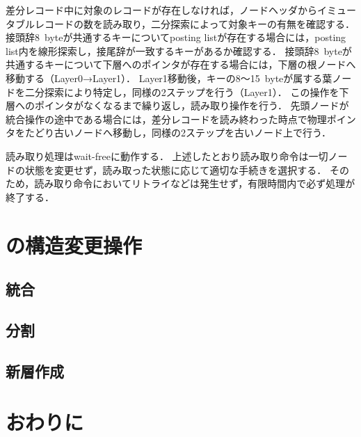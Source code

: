 差分レコード中に対象のレコードが存在しなければ，ノードヘッダからイミュータブルレコードの数を読み取り，二分探索によって対象キーの有無を確認する．
接頭辞8~byteが共通するキーについてposting listが存在する場合には，posting list内を線形探索し，接尾辞が一致するキーがあるか確認する．
接頭辞8~byteが共通するキーについて下層へのポインタが存在する場合には，下層の根ノードへ移動する（Layer0→Layer1）．
Layer1移動後，キーの8～15~byteが属する葉ノードを二分探索により特定し，同様の2ステップを行う（Layer1）．
この操作を下層へのポインタがなくなるまで繰り返し，読み取り操作を行う．
先頭ノードが統合操作の途中である場合には，差分レコードを読み終わった時点で物理ポインタをたどり古いノードへ移動し，同様の2ステップを古いノード上で行う．

読み取り処理はwait-freeに動作する．
上述したとおり読み取り命令は一切ノードの状態を変更せず，読み取った状態に応じて適切な手続きを選択する．
そのため，読み取り命令においてリトライなどは発生せず，有限時間内で必ず処理が終了する．

\section{\Bcforest{}の構造変更操作}
\label{sec:smo}

\subsection{統合}
\subsection{分割}
\subsection{新層作成}

\section{おわりに}
\label{sec:conclusion}

